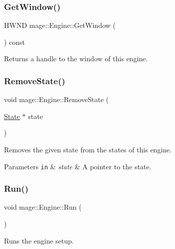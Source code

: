 \subsubsection{\texorpdfstring{Get\+Window()}{GetWindow()}}
{\footnotesize\ttfamily H\+W\+ND mage\+::\+Engine\+::\+Get\+Window (\begin{DoxyParamCaption}{ }\end{DoxyParamCaption}) const}

Returns a handle to the window of this engine. \hypertarget{classmage_1_1_engine_a72442e7262e498d0c82644f1ea413a95}{}\label{classmage_1_1_engine_a72442e7262e498d0c82644f1ea413a95} 
\subsubsection{\texorpdfstring{Remove\+State()}{RemoveState()}}
{\footnotesize\ttfamily void mage\+::\+Engine\+::\+Remove\+State (\begin{DoxyParamCaption}\item[{\hyperlink{classmage_1_1_state}{State} $\ast$}]{state }\end{DoxyParamCaption})}

Removes the given state from the states of this engine.


\begin{DoxyParams}[1]{Parameters}
\mbox{\tt in}  & {\em state} & A pointer to the state. \\
\hline
\end{DoxyParams}
\hypertarget{classmage_1_1_engine_afdc05e214d3f47a6ea3a40dfffd86f80}{}\label{classmage_1_1_engine_afdc05e214d3f47a6ea3a40dfffd86f80} 
\subsubsection{\texorpdfstring{Run()}{Run()}}
{\footnotesize\ttfamily void mage\+::\+Engine\+::\+Run (\begin{DoxyParamCaption}{ }\end{DoxyParamCaption})}

Runs the engine setup. \hypertarget{classmage_1_1_engine_a942bfa9892fa79bb1068d7c7ec4e6732}{}\label{classmage_1_1_engine_a942bfa9892fa79bb1068d7c7ec4e6732} 
